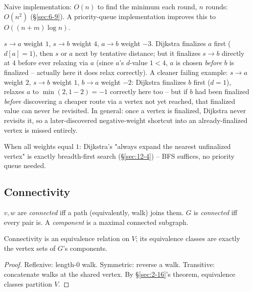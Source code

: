\documentclass[11pt]{article}
\begin{document}
\begin{note}[Complexity]
Naive implementation: $O(n)$ to find the minimum each round, $n$ rounds: $O(n^2)$ (\S\ref{sec:6-9}). A priority-queue implementation improves this to $O((n+m)\log n)$.
\end{note}

\begin{example}
$s\to a$ weight $1$, $s\to b$ weight $4$, $a\to b$ weight $-3$. Dijkstra finalizes $a$ first ($d[a]=1$), then $s$ or $a$ next by tentative distance; but it finalizes $s\to b$ directly at $4$ before ever relaxing via $a$ (since $a$'s $d$-value $1<4$, $a$ is chosen \emph{before} $b$ is finalized -- actually here it does relax correctly). A cleaner failing example: $s\to a$ weight $2$, $s\to b$ weight $1$, $b\to a$ weight $-2$: Dijkstra finalizes $b$ first ($d=1$), relaxes $a$ to $\min(2,1-2)=-1$ correctly here too -- but if $b$ had been finalized \emph{before} discovering a cheaper route via a vertex not yet reached, that finalized value can never be revisited. In general: once a vertex is finalized, Dijkstra never revisits it, so a later-discovered negative-weight shortcut into an already-finalized vertex is missed entirely.
\end{example}

\begin{note}
When all weights equal $1$: Dijkstra's "always expand the nearest unfinalized vertex" is exactly breadth-first search (\S\ref{sec:12-4}) -- BFS suffices, no priority queue needed.
\end{note}

\subsection{Connectivity}
\label{sec:11-9}

\begin{definition}
$v,w$ are \emph{connected} iff a path (equivalently, walk) joins them. $G$ is \emph{connected} iff every pair is. A \emph{component} is a maximal connected subgraph.
\end{definition}

\begin{theorem}
Connectivity is an equivalence relation on $V$; its equivalence classes are exactly the vertex sets of $G$'s components.
\end{theorem}
\begin{proof}
Reflexive: length-$0$ walk. Symmetric: reverse a walk. Transitive: concatenate walks at the shared vertex. By \S\ref{sec:2-16}'s theorem, equivalence classes partition $V$.
\end{proof}
\end{document}

